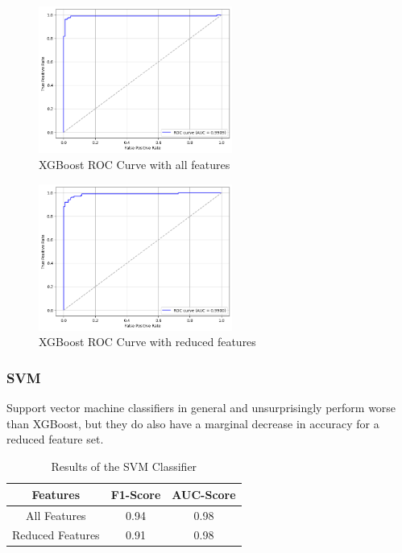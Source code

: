 \documentclass[conference]{IEEEtran}
\begin{document}
\begin{figure}[h]
	\begin{center}
		\includegraphics[width=2.5in]{xg-roc-curve}
		\caption{XGBoost ROC Curve with all features}\label{fig:xg-roc-curve}
	\end{center}
\end{figure}

\begin{figure}[h]
	\begin{center}
		\includegraphics[width=2.5in]{xg-roc-curve-reduced}
		\caption{XGBoost ROC Curve with reduced features}\label{fig:xg-roc-curve-reduced}
	\end{center}
\end{figure}

\subsubsection{SVM}

Support vector machine classifiers in general and unsurprisingly perform worse than XGBoost, but they do also have a marginal decrease in accuracy for a reduced feature set.

\begin{table}[h!]
    \begin{center}
	\begin{tabular}{| c | c c |}
		\hline
		Features & F1-Score & AUC-Score\\ [0.5ex]
		\hline
		All Features & 0.94 & 0.98    \\
		Reduced Features & 0.91 & 0.98     \\[1ex]
		\hline
	\end{tabular}
\end{center}
	\caption{Results of the SVM Classifier}
	\label{table:svm-results}
\end{table}
\end{document}
